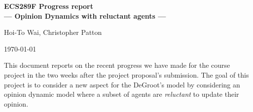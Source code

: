 \documentclass[letter]{article}
\theoremstyle{remark}
\begin{document}
\setcounter{page}{1}
\linespread{1.1}
\normalsize

\setlength{\parskip}{.2cm}

\begin{center} {\Large \textbf{
ECS289F Progress report\vspace{.2cm} \\ --- Opinion Dynamics with  reluctant agents ---}} \vspace{.3cm}

{Hoi-To Wai, Christopher Patton}

\today

\end{center}
\vspace{0.1cm}





This document reports on the recent progress we have made for the course project in the two weeks after the project proposal's submission. The goal of this project is to consider a new aspect for the DeGroot's model by considering an opinion dynamic model where a subset of agents are \emph{reluctant} to update their opinion. 

\end{document}
